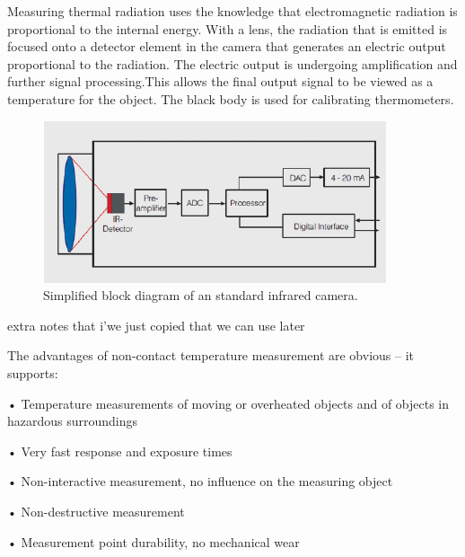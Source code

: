 Measuring thermal radiation uses the knowledge that electromagnetic radiation is proportional to the internal energy. With a lens, the radiation that is emitted is focused onto a detector element in the camera that generates an electric output proportional to the radiation. The electric output is undergoing amplification and further signal processing.This allows the final output signal to be viewed as a temperature for the object. \cite{optris2009}
The black body is used for calibrating thermometers.

\begin{figure}[H]                                         
	\includegraphics[width=.55\textwidth]{figures/IR_cam}  
	\caption{Simplified block diagram of an standard infrared camera.\cite{optris2009}}
	\label{fig:em_spectrum}  
\end{figure} 

extra notes that i'we just copied that we can use later 

The advantages of non-contact temperature measurement
are obvious – it supports:

• Temperature measurements of moving or overheated
objects and of objects in hazardous surroundings

• Very fast response and exposure times

• Non-interactive measurement, no influence on
the measuring object

• Non-destructive measurement

• Measurement point durability, no mechanical wear

